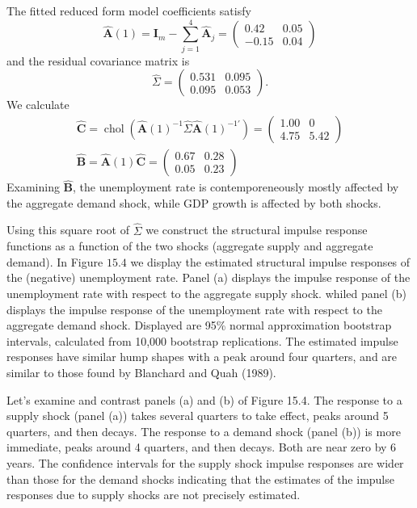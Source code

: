 \documentclass[10pt]{article}
\begin{document}
The fitted reduced form model coefficients satisfy
$$
\widehat{\boldsymbol{A}}(1)=\boldsymbol{I}_{m}-\sum_{j=1}^{4} \widehat{\boldsymbol{A}}_{j}=\left(\begin{array}{cc}
0.42 & 0.05 \\
-0.15 & 0.04
\end{array}\right)
$$
and the residual covariance matrix is
$$
\widehat{\Sigma}=\left(\begin{array}{ll}
0.531 & 0.095 \\
0.095 & 0.053
\end{array}\right) .
$$
We calculate
$$
\begin{gathered}
\widehat{\boldsymbol{C}}=\operatorname{chol}\left(\widehat{\boldsymbol{A}}(1)^{-1} \widehat{\Sigma} \widehat{\boldsymbol{A}}(1)^{-1 \prime}\right)=\left(\begin{array}{cc}
1.00 & 0 \\
4.75 & 5.42
\end{array}\right) \\
\widehat{\boldsymbol{B}}=\widehat{\boldsymbol{A}}(1) \widehat{\boldsymbol{C}}=\left(\begin{array}{cc}
0.67 & 0.28 \\
0.05 & 0.23
\end{array}\right)
\end{gathered}
$$
Examining $\widehat{\boldsymbol{B}}$, the unemployment rate is contemporeneously mostly affected by the aggregate demand shock, while GDP growth is affected by both shocks.

Using this square root of $\widehat{\Sigma}$ we construct the structural impulse response functions as a function of the two shocks (aggregate supply and aggregate demand). In Figure $15.4$ we display the estimated structural impulse responses of the (negative) unemployment rate. Panel (a) displays the impulse response of the unemployment rate with respect to the aggregate supply shock. whiled panel (b) displays the impulse response of the unemployment rate with respect to the aggregate demand shock. Displayed are 95\% normal approximation bootstrap intervals, calculated from 10,000 bootstrap replications. The estimated impulse responses have similar hump shapes with a peak around four quarters, and are similar to those found by Blanchard and Quah (1989).

Let's examine and contrast panels (a) and (b) of Figure 15.4. The response to a supply shock (panel (a)) takes several quarters to take effect, peaks around 5 quarters, and then decays. The response to a demand shock (panel (b)) is more immediate, peaks around 4 quarters, and then decays. Both are near zero by 6 years. The confidence intervals for the supply shock impulse responses are wider than those for the demand shocks indicating that the estimates of the impulse responses due to supply shocks are not precisely estimated.
\end{document}
